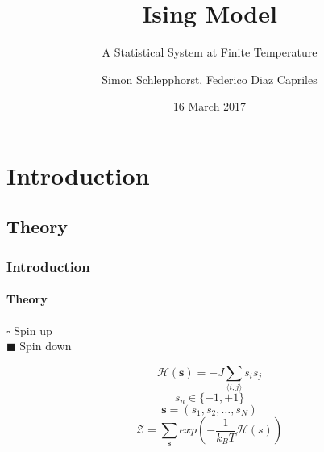 \documentclass[11pt,notes]{beamer}
\author{Simon Schlepphorst, Federico Diaz Capriles}
\title{Ising Model}
\subtitle{A Statistical System at Finite Temperature}
\institute{Uni Bonn}
\date{16 March 2017}
\begin{document}
	

\begin{frame}
	\titlepage
\end{frame}

\begin{frame}
	\tableofcontents
\end{frame}

\section{Introduction}
\subsection{Theory}
\begin{frame}
	\frametitle{Introduction}
	\framesubtitle{Theory}
	\begin{minipage}{.6\textwidth}
			\begin{center}
		\end{center}
	\end{minipage}%
	\begin{minipage}[]{.4\textwidth}
		$ \square $ Spin up \\ 
		$ \blacksquare $ Spin down 
	\end{minipage}
	\vspace{-.05cm}
	\begin{equation}
		 \mathcal{H}(\textbf{s}) = -J \sum_{\langle i, j \rangle} s_{i} s_{j}
	\end{equation}
	{\scriptsize \begin{equation*}
		 s_{n} \in \{-1,+1\}
	\end{equation*}}\vspace{-.5cm}
	\begin{equation}
		\textbf{s} = (s_{1}, s_{2}, \dots, s_{N})
	\end{equation}
	\begin{equation}
		\mathcal{Z} = \sum_{\textbf{s}} exp(-\frac{1}{k_{B} T}\mathcal{H}(s))
	\end{equation}
	

\end{frame}
\end{document}
